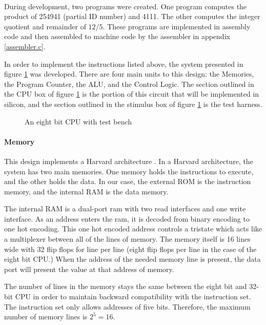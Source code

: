 \documentclass[11pt,letterpaper,final]{article}
\begin{document}
\paragraph{}

During development, two programs were created.  One program
computes the product of 254941 (partial ID number) and 4111.  The other computes
the integer quotient and remainder of $ 12 / 5 $.  These programs are
implemented in assembly code and then assembled to machine code by the assembler
in appendix \ref{assembler.c}.

In order to implement the instructions listed above, the system presented in
figure 
\ref{fig:overview} was developed.  There are four main units to this design: 
the Memories, the Program Counter, the ALU, and the Control Logic.  The section
outlined in the CPU box of figure \ref{fig:overview} is the portion of this circuit that will be implemented 
in silicon, and the section outlined in the stimulus box of figure \ref{fig:overview} is the test harness.
  
\begin{figure}[ht]
  \centering
  \caption{An eight bit CPU with test bench \cite{instructions}}
  \label{fig:overview}
\end{figure}


\pagebreak{}
\paragraph{ Memory }
This design implements a Harvard architecture \cite{wpedia:harvardarch}.  In a
Harvard architecture, the system has two main memories.  One memory holds
the instructions to execute, and the other holds the data. In our
case, the external ROM is the instruction memory, and the internal RAM is the
data memory.  

The internal RAM is a dual-port ram with two read interfaces and one write
interface.  As an address enters the ram, it is decoded from binary encoding to
one hot encoding.  This one hot encoded address controls a tristate which acts
like a multiplexer between all of the lines of memory.  The memory itself is 16 lines wide with 32 flip flops for line per line (eight flip flops per
line in the case of the eight bit CPU.) When the address of the needed memory
line is present, the data port will present the value at that address of memory.

The number of lines in the memory stays the same between the eight bit and 32-bit CPU in order to maintain backward compatibility with the instruction set.  The instruction set only allows addresses of five bits.  Therefore, the maximum number of memory lines is $2^5 = 16$.
\end{document}
